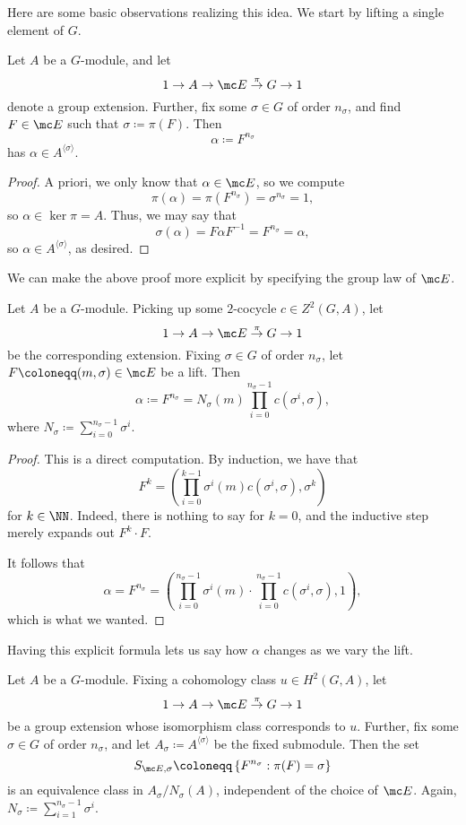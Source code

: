 \documentclass{article}
\numberwithin{equation}{section}
\begin{document}
Here are some basic observations realizing this idea. We start by lifting a single element of $ G$.
\begin{lemma} \label{lem:constructalpha}
	Let $A$ be a $ G$-module, and let 
	\[1\to A\to\mc E\stackrel\pi\to G\to1\]
	denote a group extension. Further, fix some $\sigma\in G$ of order $n_\sigma$, and find $F\in\mc E$ such that $\sigma\coloneqq\pi(F)$. Then
	\[\alpha\coloneqq F^{n_\sigma}\]
	has $\alpha\in A^{\langle\sigma\rangle}$.
\end{lemma}
\begin{proof}
	A priori, we only know that $\alpha\in\mc E$, so we compute
	\[\pi(\alpha)=\pi\left(F^{n_\sigma}\right)=\sigma^{n_\sigma}=1,\]
	so $\alpha\in\ker\pi=A$. Thus, we may say that
	\[\sigma(\alpha)=F\alpha F^{-1}=F^{n_\sigma}=\alpha,\]
	so $\alpha\in A^{\langle\sigma\rangle}$, as desired.
\end{proof}
We can make the above proof more explicit by specifying the group law of $\mc E$.
\begin{lemma} \label{lem:explicitalpha}
	Let $A$ be a $ G$-module. Picking up some $2$-cocycle $c\in Z^2( G,A)$, let
	\[1\to A\to\mc E\stackrel\pi\to G\to1\]
	be the corresponding extension. Fixing $\sigma\in G$ of order $n_\sigma$, let $F\coloneqq(m,\sigma)\in\mc E$ be a lift. Then
	\[\alpha\coloneqq F^{n_\sigma}=N_\sigma(m)\prod_{i=0}^{n_\sigma-1}c\left(\sigma^i,\sigma\right),\]
	where $N_\sigma\coloneqq\sum_{i=0}^{n_\sigma-1}\sigma^i$.
\end{lemma}
\begin{proof}
	This is a direct computation. By induction, we have that
	\[F^k=\left(\prod_{i=0}^{k-1}\sigma^i(m)c\left(\sigma^i,\sigma\right),\sigma^k\right)\]
	for $k\in\NN$. Indeed, there is nothing to say for $k=0$, and the inductive step merely expands out $F^k\cdot F$.

	It follows that
	\[\alpha=F^{n_\sigma}=\left(\prod_{i=0}^{n_\sigma-1}\sigma^i(m)\cdot\prod_{i=0}^{n_\sigma-1}c\left(\sigma^i,\sigma\right),1\right),\]
	which is what we wanted.
\end{proof}
Having this explicit formula lets us say how $\alpha$ changes as we vary the lift.
\begin{prop} \label{prop:findallalpha}
	Let $A$ be a $ G$-module. Fixing a cohomology class $u\in H^2( G,A)$, let 
	\[1\to A\to\mc E\stackrel\pi\to G\to1\]
	be a group extension whose isomorphism class corresponds to $u$. Further, fix some $\sigma\in G$ of order $n_\sigma$, and let $A_\sigma\coloneqq A^{\langle\sigma\rangle}$ be the fixed submodule. Then the set
	\[S_{\mc E,\sigma}\coloneqq\left\{F^{n_\sigma}:\pi(F)=\sigma\right\}\]
	is an equivalence class in $A_\sigma/N_\sigma(A)$, independent of the choice of $\mc E$. Again, $N_\sigma\coloneqq\sum_{i=1}^{n_\sigma-1}\sigma^i$.
\end{prop}
\end{document}
